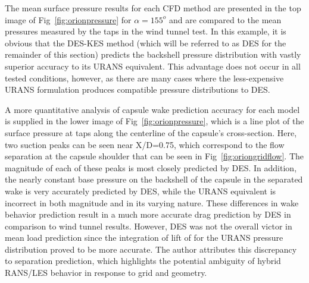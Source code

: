 \documentclass[journal]{new-aiaa}
\begin{document}
The mean surface pressure results for each CFD method are presented in the top image of Fig~\ref{fig:orionpressure} for $\alpha=155^o$ and are compared to the mean pressures measured by the taps in the wind tunnel test. In this example, it is obvious that the DES-KES method (which will be referred to as DES for the remainder of this section) predicts the backshell pressure distribution with vastly superior accuracy to its URANS equivalent. This advantage does not occur in all tested conditions, however, as there are many cases where the less-expensive URANS formulation produces compatible pressure distributions to DES.

A more quantitative analysis of capsule wake prediction accuracy for each model is supplied in the lower image of Fig~\ref{fig:orionpressure}, which is a line plot of the surface pressure at taps along the centerline of the capsule's cross-section. Here, two suction peaks can be seen near X/D=0.75, which correspond to the flow separation at the capsule shoulder that can be seen in Fig~\ref{fig:oriongridflow}. The magnitude of each of these peaks is most closely predicted by DES. In addition, the nearly constant base pressure on the backshell of the capsule in the separated wake is very accurately predicted by DES, while the URANS equivalent is incorrect in both magnitude and in its varying nature.  These differences in wake behavior prediction result in a much more accurate drag prediction by DES in comparison to wind tunnel results. However, DES was not the overall victor in mean load prediction since the integration of lift of for the URANS pressure distribution proved to be more accurate. The author attributes this discrepancy to separation prediction, which highlights the potential ambiguity of hybrid RANS/LES behavior in response to grid and geometry.
\end{document}
